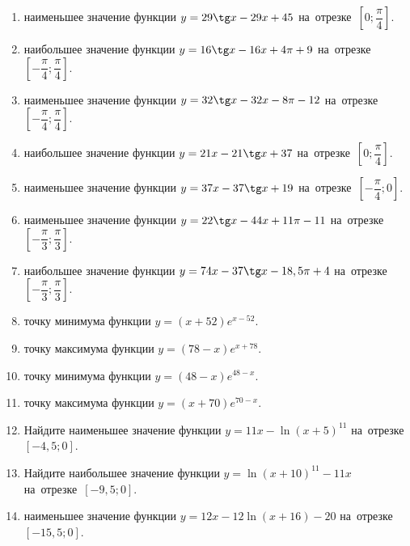 \documentclass[a4paper,10pt]{article}
\begin{document}
\begin{enumerate}
\item {} наименьшее значение функции $y = 29\tg x-29x+45$ на~отрезке~$\left[0;\dfrac{\pi }{4}\right]$.

\item {} наибольшее значение функции $y=16\tg x-16x+4\pi +9$ на~отрезке~$\left[-\dfrac{\pi }{4};\dfrac{\pi }{4}\right]$.

\item {} наименьшее значение функции $y=32\tg x-32x-8\pi -12$ на~отрезке~$\left[-\dfrac{\pi }{4};\dfrac{\pi }{4}\right]$.

\item {} наибольшее значение функции $y = 21x-21\tg x +37$ на~отрезке~$\left[0;\dfrac{\pi }{4}\right]$.

\item {} наименьшее значение функции $y = 37x-37\tg x +19$ на~отрезке~$\left[-\dfrac{\pi }{4};0\right]$.

\item {} наименьшее значение функции $y = 22\tg x-44x+11 \pi -11$ на~отрезке~$\left[-\dfrac{\pi }{3};\dfrac{\pi }{3}\right]$.

\item {} наибольшее значение функции $y = 74x-37\tg x-18,5\pi +4$ на~отрезке~$\left[-\dfrac{\pi }{3};\dfrac{\pi }{3}\right]$.

\item {} точку минимума функции $y = \left(x+52\right)e^{x-52}$.

\item {} точку максимума функции $y = \left(78-x\right)e^{x+78}$.

\item {} точку минимума функции $y = \left(48-x\right)e^{48-x}$.

\item {} точку максимума функции $y = \left(x+70\right)e^{70-x}$.

\item Найдите наименьшее значение функции $y = 11x-\ln \left(x+5\right)^{11}$ на~отрезке~$\left[-4,5;0\right]$.

\item Найдите наибольшее значение функции $y = \ln \left(x+10\right)^{11}-11x$ на~отрезке~$\left[-9,5;0\right]$.

\item {} наименьшее значение функции $y = 12x-12\ln \left(x+16\right) -20$ на~отрезке~$\left[-15,5;0\right]$.


\end{enumerate}
\end{document}
